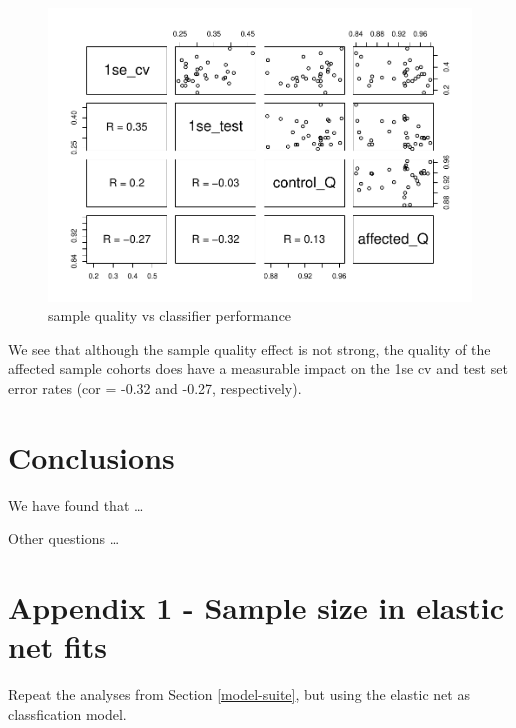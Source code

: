 \documentclass[
]{book}
\begin{document}
\begin{figure}
\centering
\includegraphics{Static/figures/small-sample-qual-1.pdf}
\caption{\label{fig:small-sample-qual}sample quality vs classifier performance}
\end{figure}

We see that although the sample quality effect is not strong, the quality of the
affected sample cohorts does have a measurable impact on the 1se cv and test set error
rates (cor = -0.32 and -0.27, respectively).

\hypertarget{conclusions}{%
\chapter{Conclusions}\label{conclusions}}

We have found that \ldots{}

Other questions \ldots{}

\hypertarget{appendix-1}{%
\chapter*{Appendix 1 - Sample size in elastic net fits}\label{appendix-1}}

Repeat the analyses from Section \ref{model-suite}, but using
the elastic net as classfication model.
\end{document}
